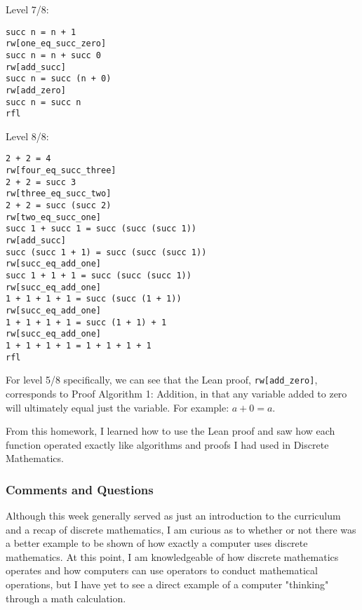 \documentclass{article}
\theoremstyle{theorem}
\theoremstyle{definition}
\theoremstyle{remark}
\begin{document}
Level 7/8:
\begin{lstlisting}
succ n = n + 1
rw[one_eq_succ_zero]
succ n = n + succ 0
rw[add_succ]
succ n = succ (n + 0)
rw[add_zero]
succ n = succ n
rfl
\end{lstlisting}

Level 8/8:
\begin{lstlisting}
2 + 2 = 4
rw[four_eq_succ_three]
2 + 2 = succ 3
rw[three_eq_succ_two]
2 + 2 = succ (succ 2)
rw[two_eq_succ_one]
succ 1 + succ 1 = succ (succ (succ 1))
rw[add_succ]
succ (succ 1 + 1) = succ (succ (succ 1))
rw[succ_eq_add_one]
succ 1 + 1 + 1 = succ (succ (succ 1))
rw[succ_eq_add_one]
1 + 1 + 1 + 1 = succ (succ (1 + 1))
rw[succ_eq_add_one]
1 + 1 + 1 + 1 = succ (1 + 1) + 1
rw[succ_eq_add_one]
1 + 1 + 1 + 1 = 1 + 1 + 1 + 1
rfl
\end{lstlisting}

For level 5/8 specifically, we can see that the Lean proof, \texttt{rw[add\_zero]}, corresponds to Proof Algorithm 1: Addition, in that any variable added to zero will ultimately equal just the variable. For example: $a + 0 = a$.

From this homework, I learned how to use the Lean proof and saw how each function operated exactly like algorithms and proofs I had used in Discrete Mathematics.

%
%

\subsubsection*{Comments and Questions}

Although this week generally served as just an introduction to the curriculum and a recap of discrete mathematics, I am curious as to whether or not there was a better example to be shown of how exactly a computer uses discrete mathematics. At this point, I am knowledgeable of how discrete mathematics operates and how computers can use operators to conduct mathematical operations, but I have yet to see a direct example of a computer "thinking" through a math calculation.
\end{document}

